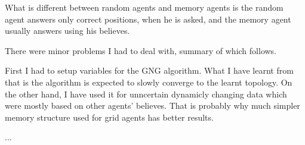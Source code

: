 What is different between random agents and memory agents is the random agent answers only correct positions, when he is asked, and the memory agent usually answers using his believes.


There were minor problems I had to deal with, summary of which follows.

First I had to setup variables for the GNG algorithm. What I have learnt from that is the algorithm is expected to slowly converge to the learnt topology. On the other hand, I have used it for unncertain dynamicly changing data which were mostly based on other agents' believes. That is probably why much simpler memory structure used for grid agents has better results.

...

 

